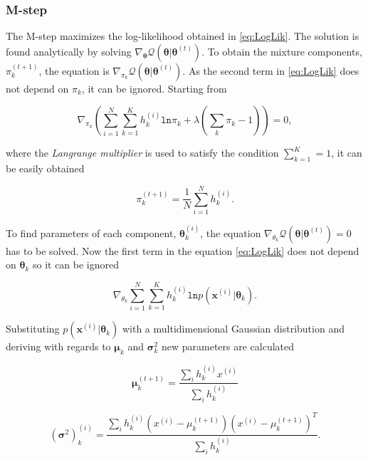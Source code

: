 \subsubsection{M-step}

The M-step maximizes the log-likelihood obtained in \ref{eq:LogLik}. The solution is found analytically by solving $\nabla_{\boldsymbol \theta} \mathcal{Q}(\boldsymbol \theta | \boldsymbol \theta^{(t)})$. To obtain the mixture components, $\pi_k^{(t+1)}$, the equation is $\nabla_{\pi_k}\mathcal{Q}(\boldsymbol \theta | \boldsymbol \theta^{(t)})$. As the second term in \ref{eq:LogLik} does not depend on $\pi_k$, it can be ignored. Starting from 

\begin{equation}
	\nabla_{\pi_k} \left ( \sum_{i=1}^N \sum_{k=1}^K h_k^{(i)} \mathtt{ln}\pi_k + \lambda \left ( \sum_k\pi_k - 1 \right )  \right ) = 0,
\end{equation}

where the \textit{Langrange multiplier} is used to satisfy the condition $\sum_{k=1}^{K} = 1$, it can be easily obtained 

\begin{equation}
	\pi_k^{(t+1)} = \frac{1}{N} \sum_{i=1}^N h_k^{(i)}.
\end{equation}

To find parameters of each component, $\boldsymbol \theta_k^{(i)}$, the equation $\nabla_{\theta_k} \mathcal{Q}(\boldsymbol \theta | \boldsymbol \theta^{(t)}) = 0$ has to be solved. Now the first term in the equation \ref{eq:LogLik} does not depend on $\boldsymbol \theta_k$ so it can be ignored 

\begin{equation}
	\nabla_{\theta_k} \sum_{i=1}^N \sum_{k=1}^K h_k^{(i)}\mathtt{ln}p(\mathbf{x}^{(i)} | \boldsymbol \theta_k).
\end{equation}

Substituting $p(\mathbf{x}^{(i)} | \boldsymbol \theta_k)$ with a multidimensional Gaussian distribution and deriving with regards to $\boldsymbol \mu_k$ and $\boldsymbol \sigma_k^2$ new parameters are calculated

\begin{equation}
	\boldsymbol \mu_k^{(t+1)} = \frac{\sum_ih_k^{(i)}x^{(i)}}{\sum_ih_k^{(i)}} 
\end{equation}

\begin{equation}
	(\boldsymbol \sigma^2)_k^{(i)} = \frac{\sum_ih_k^{(i)}(x^{(i)} - \mu_k^{(t+1)})(x^{(i)} - \mu_k^{(t+1)})^T}{{\sum_ih_k^{(i)}}}.
\end{equation}

